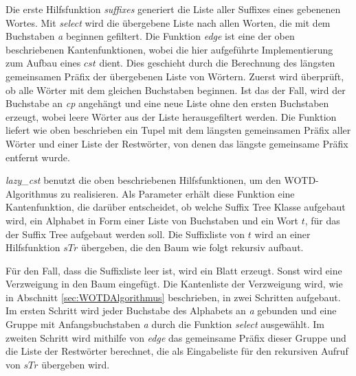 \documentclass[12pt]{report}
\begin{document}
Die erste Hilfsfunktion \textit{suffixes} generiert die Liste aller Suffixes eines gebenenen Wortes. Mit \textit{select} wird die übergebene Liste nach allen Worten, die mit dem Buchstaben \textit{a} beginnen gefiltert. Die Funktion \textit{edge} ist eine der oben beschriebenen Kantenfunktionen, wobei die hier aufgeführte Implementierung zum Aufbau eines $cst$ dient. Dies geschieht durch die Berechnung des längsten gemeinsamen Präfix der übergebenen Liste von Wörtern. Zuerst wird überprüft, ob alle Wörter mit dem gleichen Buchstaben beginnen. Ist das der Fall, wird der Buchstabe an \textit{cp} angehängt und eine neue Liste ohne den ersten Buchstaben erzeugt, wobei leere Wörter aus der Liste herausgefiltert werden. Die Funktion liefert wie oben beschrieben ein Tupel mit dem längsten gemeinsamen Präfix aller Wörter und einer Liste der Restwörter, von denen das längste gemeinsame Präfix entfernt wurde.

\textit{lazy\_cst} benutzt die oben beschriebenen Hilfsfunktionen, um den WOTD-Algorithmus zu realisieren. Als Parameter erhält diese Funktion eine Kantenfunktion, die darüber entscheidet, ob welche Suffix Tree Klasse aufgebaut wird, ein Alphabet in Form einer Liste von Buchstaben und ein Wort $t$, für das der Suffix Tree aufgebaut werden soll. Die Suffixliste von $t$ wird an einer Hilfsfunktion $sTr$ übergeben, die den Baum wie folgt rekursiv aufbaut.

Für den Fall, dass die Suffixliste leer ist, wird ein Blatt erzeugt. Sonst wird eine Verzweigung in den Baum eingefügt. Die Kantenliste der Verzweigung wird, wie in Abschnitt \ref{sec:WOTDAlgorithmus} beschrieben, in zwei Schritten aufgebaut. Im ersten Schritt wird jeder Buchstabe des Alphabets an \textit{a} gebunden und eine Gruppe mit Anfangsbuchstaben \textit{a} durch die Funktion \textit{select} ausgewählt. Im zweiten Schritt wird mithilfe von \textit{edge} das gemeinsame Präfix dieser Gruppe und die Liste der Restwörter berechnet, die als Eingabeliste für den rekursiven Aufruf von $sTr$ übergeben wird.

\end{document}
